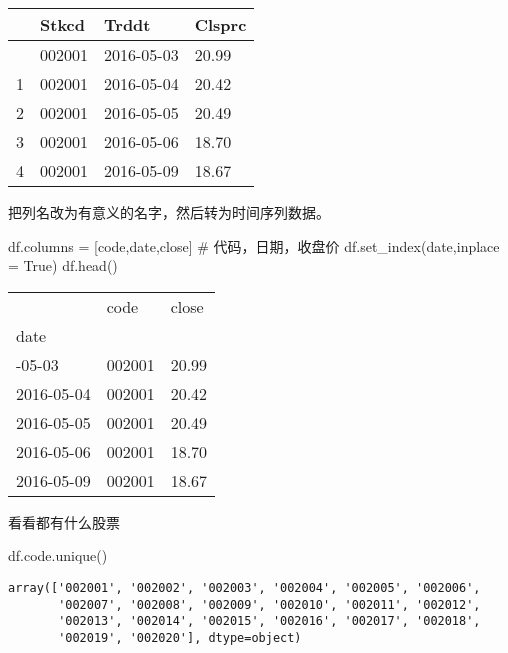 \documentclass[
  letterpaper,
  DIV=11,
  numbers=noendperiod]{scrreprt}
\newenvironment{Shaded}{\begin{snugshade}}{\end{snugshade}}
\newcommand{\CommentTok}[1]{\textcolor[rgb]{0.37,0.37,0.37}{#1}}
\newcommand{\NormalTok}[1]{\textcolor[rgb]{0.00,0.23,0.31}{#1}}
\newcommand{\OperatorTok}[1]{\textcolor[rgb]{0.37,0.37,0.37}{#1}}
\newcommand{\StringTok}[1]{\textcolor[rgb]{0.13,0.47,0.30}{#1}}
\newcommand{\VariableTok}[1]{\textcolor[rgb]{0.07,0.07,0.07}{#1}}
\begin{document}
\begin{longtable}[]{@{}llll@{}}
\toprule\noalign{}
& Stkcd & Trddt & Clsprc \\
\midrule\noalign{}
\endhead
\bottomrule\noalign{}
\endlastfoot
0 & 002001 & 2016-05-03 & 20.99 \\
1 & 002001 & 2016-05-04 & 20.42 \\
2 & 002001 & 2016-05-05 & 20.49 \\
3 & 002001 & 2016-05-06 & 18.70 \\
4 & 002001 & 2016-05-09 & 18.67 \\
\end{longtable}

把列名改为有意义的名字，然后转为时间序列数据。

\begin{Shaded}
\begin{Highlighting}[]
\NormalTok{df.columns }\OperatorTok{=}\NormalTok{ [}\StringTok{\textquotesingle{}code\textquotesingle{}}\NormalTok{,}\StringTok{\textquotesingle{}date\textquotesingle{}}\NormalTok{,}\StringTok{\textquotesingle{}close\textquotesingle{}}\NormalTok{] }\CommentTok{\# 代码，日期，收盘价}
\NormalTok{df.set\_index(}\StringTok{\textquotesingle{}date\textquotesingle{}}\NormalTok{,inplace }\OperatorTok{=} \VariableTok{True}\NormalTok{)}
\NormalTok{df.head()}
\end{Highlighting}
\end{Shaded}

\begin{longtable}[]{@{}lll@{}}
\toprule\noalign{}
& code & close \\
date & & \\
\midrule\noalign{}
\endhead
\bottomrule\noalign{}
\endlastfoot
2016-05-03 & 002001 & 20.99 \\
2016-05-04 & 002001 & 20.42 \\
2016-05-05 & 002001 & 20.49 \\
2016-05-06 & 002001 & 18.70 \\
2016-05-09 & 002001 & 18.67 \\
\end{longtable}

看看都有什么股票

\begin{Shaded}
\begin{Highlighting}[]
\NormalTok{df.code.unique()}
\end{Highlighting}
\end{Shaded}

\begin{verbatim}
array(['002001', '002002', '002003', '002004', '002005', '002006',
       '002007', '002008', '002009', '002010', '002011', '002012',
       '002013', '002014', '002015', '002016', '002017', '002018',
       '002019', '002020'], dtype=object)
\end{verbatim}
\end{document}
